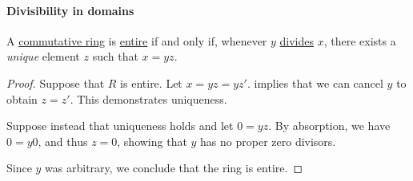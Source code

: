 \paragraph{Divisibility in domains}

\begin{proposition}\label{thm:ring_entire_iff_unique_quotient}
  A \hyperref[def:ring/commutative]{commutative ring} is \hyperref[def:entire_semiring]{entire} if and only if, whenever \( y \) \hyperref[def:semiring_divisibility]{divides} \( x \), there exists a \emph{unique} element \( z \) such that \( x = yz \).
\end{proposition}
\begin{proof}
  \SufficiencySubProof Suppose that \( R \) is entire. Let \( x = yz = yz' \).  implies that we can cancel \( y \) to obtain \( z = z' \). This demonstrates uniqueness.

  \NecessitySubProof Suppose instead that uniqueness holds and let \( 0 = yz \). By absorption, we have \( 0 = y0 \), and thus \( z = 0 \), showing that \( y \) has no proper zero divisors.

  Since \( y \) was arbitrary, we conclude that the ring is entire.
\end{proof}

